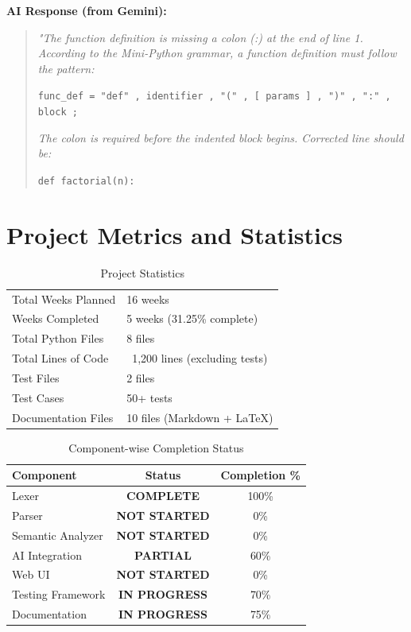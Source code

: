 \documentclass[a4paper,11pt]{article}
\newcommand{\statusgood}[1]{\colorbox{green!20}{\textbf{#1}}}
\newcommand{\statuspending}[1]{\colorbox{yellow!20}{\textbf{#1}}}
\newcommand{\statusissue}[1]{\colorbox{red!20}{\textbf{#1}}}
\begin{document}
\textbf{AI Response (from Gemini):}
\begin{quote}
\textit{"The function definition is missing a colon (:) at the end of line 1. According to the Mini-Python grammar, a function definition must follow the pattern:}

\texttt{func\_def = "def" , identifier , "(" , [ params ] , ")" , ":" , block ;}

\textit{The colon is required before the indented block begins. Corrected line should be:}

\texttt{def factorial(n):}
\end{quote}

\clearpage

\section{Project Metrics and Statistics}

\begin{table}[H]
\centering
\begin{tabularx}{\textwidth}{|l|X|}
\hline
\rowcolor{blue!10}
\multicolumn{2}{|c|}{\textbf{Overall Project Statistics}} \\
\hline
Total Weeks Planned & 16 weeks \\
\hline
Weeks Completed & 5 weeks (31.25\% complete) \\
\hline
Total Python Files & 8 files \\
\hline
Total Lines of Code & ~1,200 lines (excluding tests) \\
\hline
Test Files & 2 files \\
\hline
Test Cases & 50+ tests \\
\hline
Documentation Files & 10 files (Markdown + LaTeX) \\
\hline
\end{tabularx}
\caption{Project Statistics}
\end{table}

\begin{table}[H]
\centering
\begin{tabularx}{\textwidth}{|l|c|c|}
\hline
\rowcolor{blue!10}
\textbf{Component} & \textbf{Status} & \textbf{Completion \%} \\
\hline
Lexer & \statusgood{COMPLETE} & 100\% \\
\hline
Parser & \statusissue{NOT STARTED} & 0\% \\
\hline
Semantic Analyzer & \statusissue{NOT STARTED} & 0\% \\
\hline
AI Integration & \statuspending{PARTIAL} & 60\% \\
\hline
Web UI & \statusissue{NOT STARTED} & 0\% \\
\hline
Testing Framework & \statuspending{IN PROGRESS} & 70\% \\
\hline
Documentation & \statuspending{IN PROGRESS} & 75\% \\
\hline
\end{tabularx}
\caption{Component-wise Completion Status}
\end{table}
\end{document}
